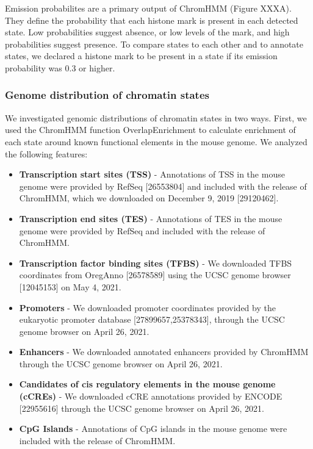\documentclass[10pt,letterpaper]{article}
\providecommand{\tightlist}{%
  \setlength{\itemsep}{0pt}\setlength{\parskip}{0pt}}
\begin{document}
Emission probabilites are a primary output of ChromHMM (Figure XXXA).
They define the probability that each histone mark is present in each
detected state. Low probabilities suggest absence, or low levels of the
mark, and high probabilities suggest presence. To compare states to each
other and to annotate states, we declared a histone mark to be present
in a state if its emission probability was 0.3 or higher.

\hypertarget{genome-distribution-of-chromatin-states}{%
\subsubsection{Genome distribution of chromatin
states}\label{genome-distribution-of-chromatin-states}}

We investigated genomic distributions of chromatin states in two ways.
First, we used the ChromHMM function OverlapEnrichment to calculate
enrichment of each state around known functional elements in the mouse
genome. We analyzed the following features:

\begin{itemize}
\tightlist
\item
  \textbf{Transcription start sites (TSS)} - Annotations of TSS in the
  mouse genome were provided by RefSeq {[}26553804{]} and included with
  the release of ChromHMM, which we downloaded on December 9, 2019
  {[}29120462{]}.
\item
  \textbf{Transcription end sites (TES)} - Annotations of TES in the
  mouse genome were provided by RefSeq and included with the release of
  ChromHMM.
\item
  \textbf{Transcription factor binding sites (TFBS)} - We downloaded
  TFBS coordinates from OregAnno {[}26578589{]} using the UCSC genome
  browser {[}12045153{]} on May 4, 2021.
\item
  \textbf{Promoters} - We downloaded promoter coordinates provided by
  the eukaryotic promoter database {[}27899657,25378343{]}, through the
  UCSC genome browser on April 26, 2021.
\item
  \textbf{Enhancers} - We downloaded annotated enhancers provided by
  ChromHMM through the UCSC genome browser on April 26, 2021.
\item
  \textbf{Candidates of cis regulatory elements in the mouse genome
  (cCREs)} - We downloaded cCRE annotations provided by ENCODE
  {[}22955616{]} through the UCSC genome browser on April 26, 2021.
\item
  \textbf{CpG Islands} - Annotations of CpG islands in the mouse genome
  were included with the release of ChromHMM.
\end{itemize}
\end{document}
